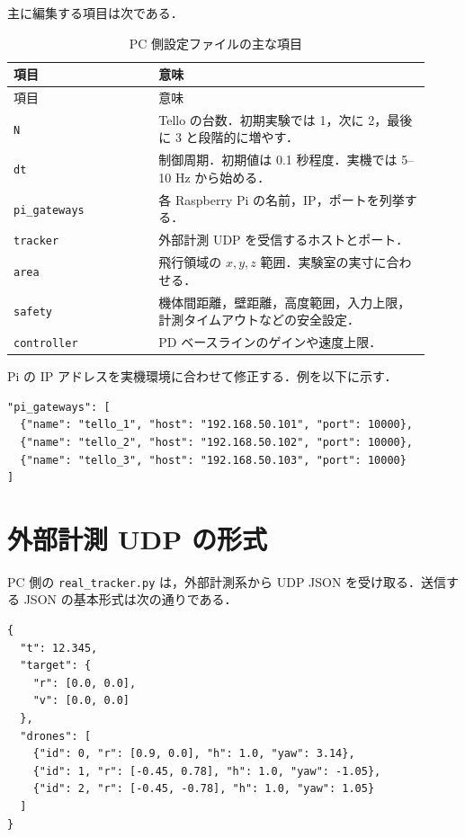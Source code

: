 主に編集する項目は次である．

\begin{longtable}{p{0.32\linewidth}p{0.60\linewidth}}
\caption{PC 側設定ファイルの主な項目}\label{tab:pc_config_items}\\
\toprule
項目 & 意味 \\
\midrule
\endfirsthead
\toprule
項目 & 意味 \\
\midrule
\endhead
\bottomrule
\endfoot
\texttt{N} & Tello の台数．初期実験では 1，次に 2，最後に 3 と段階的に増やす． \\
\texttt{dt} & 制御周期．初期値は 0.1 秒程度．実機では 5--10 Hz から始める． \\
\texttt{pi\_gateways} & 各 Raspberry Pi の名前，IP，ポートを列挙する． \\
\texttt{tracker} & 外部計測 UDP を受信するホストとポート． \\
\texttt{area} & 飛行領域の $x,y,z$ 範囲．実験室の実寸に合わせる． \\
\texttt{safety} & 機体間距離，壁距離，高度範囲，入力上限，計測タイムアウトなどの安全設定． \\
\texttt{controller} & PD ベースラインのゲインや速度上限． \\
\end{longtable}

Pi の IP アドレスを実機環境に合わせて修正する．例を以下に示す．

\begin{lstlisting}
"pi_gateways": [
  {"name": "tello_1", "host": "192.168.50.101", "port": 10000},
  {"name": "tello_2", "host": "192.168.50.102", "port": 10000},
  {"name": "tello_3", "host": "192.168.50.103", "port": 10000}
]
\end{lstlisting}

\section{外部計測 UDP の形式}
\label{sec:tracker_schema}

PC 側の \texttt{real\_tracker.py} は，外部計測系から UDP JSON を受け取る．送信する JSON の基本形式は次の通りである．

\begin{lstlisting}
{
  "t": 12.345,
  "target": {
    "r": [0.0, 0.0],
    "v": [0.0, 0.0]
  },
  "drones": [
    {"id": 0, "r": [0.9, 0.0], "h": 1.0, "yaw": 3.14},
    {"id": 1, "r": [-0.45, 0.78], "h": 1.0, "yaw": -1.05},
    {"id": 2, "r": [-0.45, -0.78], "h": 1.0, "yaw": 1.05}
  ]
}
\end{lstlisting}

